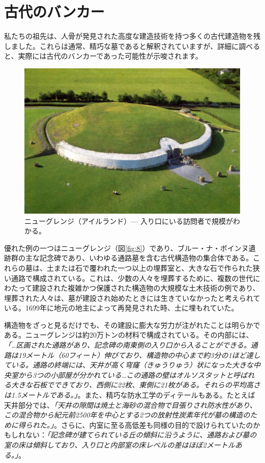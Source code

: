 \documentclass[10pt,twocolumn,letterpaper]{article}
\begin{document}
\section{古代のバンカー}

私たちの祖先は、人骨が発見された高度な建造技術を持つ多くの古代建造物を残しました。これらは通常、精巧な墓であると解釈されていますが、詳細に調べると、実際には古代のバンカーであった可能性が示唆されます。

\begin{figure}[b]
\begin{center}
   \includegraphics[width=1\linewidth]{ww19.jpg}
\end{center}
   \caption{ニューグレンジ（アイルランド）— 入り口にいる訪問者で規模がわかる。}
\label{fig:8}
\label{fig:onecol}
\end{figure}

優れた例の一つはニューグレンジ（図\ref{fig:8}）であり、ブルー・ナ・ボインヌ遺跡群の主な記念碑であり、いわゆる通路墓を含む古代構造物の集合体である。これらの墓は、土または石で覆われた一つ以上の埋葬室と、大きな石で作られた狭い通路で構成されている\cite{70}。これは、少数の人々を埋葬するために、複数の世代にわたって建設された複雑かつ保護された構造物の大規模な土木技術の例であり、埋葬された人々は、墓が建設され始めたときには生きていなかったと考えられている。1699年に地元の地主によって再発見された時、土に埋もれていた。

構造物をざっと見るだけでも、その建設に膨大な労力が注がれたことは明らかである。ニューグレンジは約20万トンの材料で構成されている。その内部には、\textit{「…区画された通路があり、記念碑の南東側の入り口から入ることができる。通路は19メートル（60フィート）伸びており、構造物の中心まで約3分の1ほど達している。通路の終端には、天井が高く穹窿（きゅうりゅう）状になった大きな中央室から3つの小部屋が分かれている…この通路の壁はオルソスタットと呼ばれる大きな石板でできており、西側に22枚、東側に21枚がある。それらの平均高さは1.5メートルである。」}\cite{70}。また、精巧な防水工学のディテールもある。たとえば天井部分では、\textit{「天井の隙間は焼土と海砂の混合物で目張りされ防水性があり、この混合物から紀元前2500年を中心とする2つの放射性炭素年代が墓の構造のために得られた。」}\cite{71}。さらに、内室に至る高低差も同様の目的で設けられていたのかもしれない：\textit{「記念碑が建てられている丘の傾斜に沿うように、通路および墓の室の床は傾斜しており、入り口と内部室の床レベルの差はほぼ2メートルある。」}\cite{71}。
\end{document}
